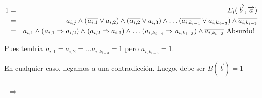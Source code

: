 \documentclass[12pt,a4paper]{report}
\begin{document}
\begin{itemize}
							\begin{eqnarray}
								\nonumber 1 &=& E_{i}(\overrightarrow{b}, \overrightarrow{a}) \\
								\nonumber &=& a_{i, j} \wedge (\overline{a_{i, 1}} \vee a_{i, 2}) \wedge (\overline{a_{i, 2}} \vee a_{i, 3}) \wedge \dotsc  	(\overline{a_{i, k_{i-4}}} \vee a_{i, k_{i-3}}) \wedge \overline{a_{i, k_{i-3}}} \\
								\nonumber &=& a_{i, 1} \wedge (a_{i, 1} \Rightarrow a_{i, 2}) \wedge (a_{i, 2}\Rightarrow a_{i, 3}) \wedge 	\dotsc (a_{i, k_{i-4}} \Rightarrow a_{i, k_{i-3}}) \wedge \overline{a_{i, k_{i-3}}} \textup{ Absurdo! }
							\end{eqnarray}

							\par Pues tendría $a_{i, 1} = a_{i, 2} = \dotsc a_{i, k_{i-3}} = 1$ pero $\overline{a_{i, k_{i-3}}} = 1$.
					\end{itemize}
				\par En cualquier caso, llegamos a una contradicción. Luego, debe ser $B(\overrightarrow{b}) = 1$

			\vspace{5mm}
			\begin{tabular}{|c|} \hline $\Rightarrow$ \\\hline \end{tabular}
\end{document}
